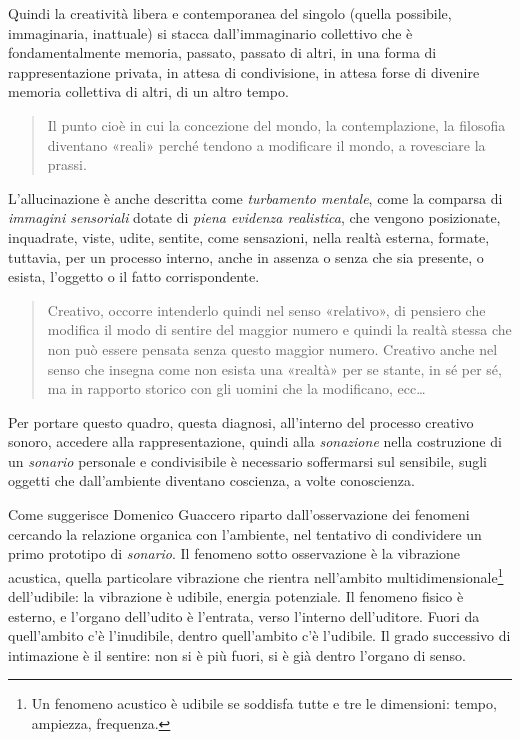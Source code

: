 Quindi la creatività libera e contemporanea \cite{agamben2008che} del singolo
(quella possibile, immaginaria, inattuale) si stacca dall'immaginario collettivo
che è fondamentalmente memoria, passato, passato di altri, in una forma di
rappresentazione privata, in attesa di condivisione, in attesa forse di divenire
memoria collettiva di altri, di un altro tempo.

\begin{quote}
  Il punto cioè in cui la concezione del mondo, la contemplazione, la filosofia
  diventano «reali» perché tendono a modificare il mondo, a rovesciare la prassi.
  \cite{ag:matst}
\end{quote}%

L'allucinazione è anche descritta come \emph{turbamento mentale}, come la
comparsa di \emph{immagini sensoriali} dotate di \emph{piena evidenza realistica},
che vengono posizionate, inquadrate, viste, udite, sentite, come sensazioni,
nella realtà esterna, formate, tuttavia, per un processo interno, anche in
assenza o senza che sia presente, o esista, l'oggetto o il fatto corrispondente.

\begin{quote}
  Creativo, occorre intenderlo quindi nel senso «relativo», di pensiero che
  modifica il modo di sentire del maggior numero e quindi la realtà stessa che
  non può essere pensata senza questo maggior numero. Creativo anche nel senso
  che insegna come non esista una «realtà» per se stante, in sé per sé, ma in
  rapporto storico con gli uomini che la modificano, ecc\ldots \cite{ag:matst}
\end{quote}%

Per portare questo quadro, questa diagnosi, all'interno del processo creativo
sonoro, accedere alla rappresentazione, quindi alla \emph{sonazione} nella
costruzione di un \emph{sonario} personale e condivisibile è necessario
soffermarsi sul sensibile, sugli oggetti che dall'ambiente diventano coscienza,
a volte conoscienza.

Come suggerisce Domenico Guaccero \cite{branchi1977tecnologia} riparto
dall'osservazione dei fenomeni cercando la relazione organica con
l'ambiente, nel tentativo di condividere un primo prototipo di \emph{sonario}.
Il fenomeno sotto osservazione è la vibrazione acustica, quella particolare
vibrazione che rientra nell'ambito multidimensionale\footnote{%
  Un fenomeno acustico è udibile se soddisfa tutte e tre le dimensioni: tempo,
  ampiezza, frequenza.
} dell'udibile: la vibrazione è udibile, energia potenziale. Il fenomeno fisico
è esterno, e l'organo dell'udito è l'entrata, verso l'interno dell'uditore.
Fuori da quell'ambito c'è l'inudibile, dentro quell'ambito c'è l'udibile. Il
grado successivo di intimazione è il sentire: non si è più fuori, si è già
dentro l'organo di senso.

